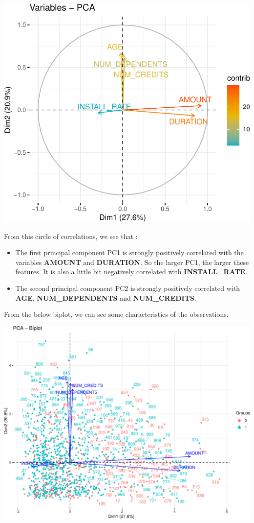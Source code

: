\documentclass[
]{article}
\providecommand{\tightlist}{%
  \setlength{\itemsep}{0pt}\setlength{\parskip}{0pt}}
\begin{document}
\includegraphics{report_files/figure-latex/unnamed-chunk-19-1.pdf}

From this circle of correlations, we see that :

\begin{itemize}
\tightlist
\item
  The first principal component PC1 is strongly positively correlated
  with the variables \textbf{AMOUNT} and \textbf{DURATION}. So the
  larger PC1, the larger these features. It is also a little bit
  negatively correlated with \textbf{INSTALL\_RATE}.\\
\item
  The second principal component PC2 is strongly positively correlated
  with \textbf{AGE}, \textbf{NUM\_DEPENDENTS} and \textbf{NUM\_CREDITS}.
\end{itemize}

From the below biplot, we can see some characteristics of the
observations.

\begin{center}\includegraphics[width=1.2\linewidth]{report_files/figure-latex/unnamed-chunk-20-1} \end{center}
\end{document}
